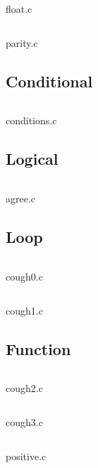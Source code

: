 \begin{code}[ht!]
	\inputminted[linenos]{c}{codes/float.c}
	\caption{float.c}
\end{code}

\begin{code}[ht!]
	\inputminted[linenos]{c}{codes/parity.c}
	\caption{parity.c}
\end{code}

\clearpage
\subsection{Conditional}
\begin{code}[ht!]
	\inputminted[linenos]{c}{codes/conditions.c}
	\caption{conditions.c}
\end{code}

\clearpage
\subsection{Logical}
\begin{code}[ht!]
	\inputminted[linenos]{c}{codes/agree.c}
	\caption{agree.c}
\end{code}

\clearpage
\subsection{Loop}
\begin{code}[ht!]
	\inputminted[linenos]{c}{codes/src1/cough0.c}
	\caption{cough0.c}
\end{code}

\begin{code}[ht!]
	\inputminted[linenos]{c}{codes/src1/cough1.c}
	\caption{cough1.c}
\end{code}

\clearpage
\subsection{Function}
\begin{code}[ht!]
	\inputminted[linenos]{c}{codes/src1/cough2.c}
	\caption{cough2.c}
\end{code}

\begin{code}[ht!]
	\inputminted[linenos]{c}{codes/src1/cough3.c}
	\caption{cough3.c}
\end{code}

\begin{code}[ht!]
	\inputminted[linenos]{c}{codes/src1/positive.c}
	\caption{positive.c}
\end{code}

